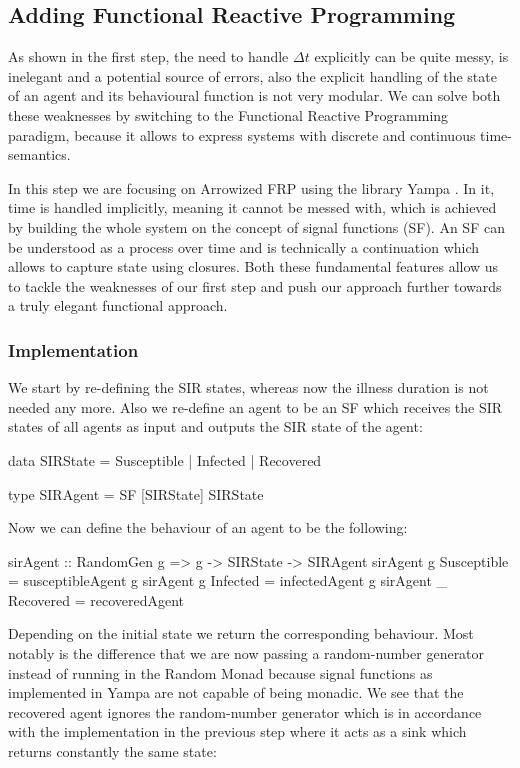 \subsection{Adding Functional Reactive Programming}
\label{sec:step2_frp}
As shown in the first step, the need to handle $\Delta t$ explicitly can be quite messy, is inelegant and a potential source of errors, also the explicit handling of the state of an agent and its behavioural function is not very modular. We can solve both these weaknesses by switching to the Functional Reactive Programming paradigm, because it allows to express systems with discrete and continuous time-semantics.

In this step we are focusing on Arrowized FRP \cite{hughes_generalising_2000} using the library Yampa \cite{hudak_arrows_2003}. In it, time is handled implicitly, meaning it cannot be messed with, which is achieved by building the whole system on the concept of signal functions (SF). An SF can be understood as a process over time and is technically a continuation which allows to capture state using closures. Both these fundamental features allow us to tackle the weaknesses of our first step and push our approach further towards a truly elegant functional approach.

\subsubsection{Implementation}
We start by re-defining the SIR states, whereas now the illness duration is not needed any more. Also we re-define an agent to be an SF which receives the SIR states of all agents as input and outputs the SIR state of the agent:

\begin{HaskellCode}
data SIRState = Susceptible | Infected | Recovered

type SIRAgent = SF [SIRState] SIRState 
\end{HaskellCode}

Now we can define the behaviour of an agent to be the following:

\begin{HaskellCode}
sirAgent :: RandomGen g => g -> SIRState -> SIRAgent
sirAgent g Susceptible = susceptibleAgent g
sirAgent g Infected    = infectedAgent g
sirAgent _ Recovered   = recoveredAgent
\end{HaskellCode}

Depending on the initial state we return the corresponding behaviour. Most notably is the difference that we are now passing a random-number generator instead of running in the Random Monad because signal functions as implemented in Yampa are not capable of being monadic. We see that the recovered agent ignores the random-number generator which is in accordance with the implementation in the previous step where it acts as a sink which returns constantly the same state:

